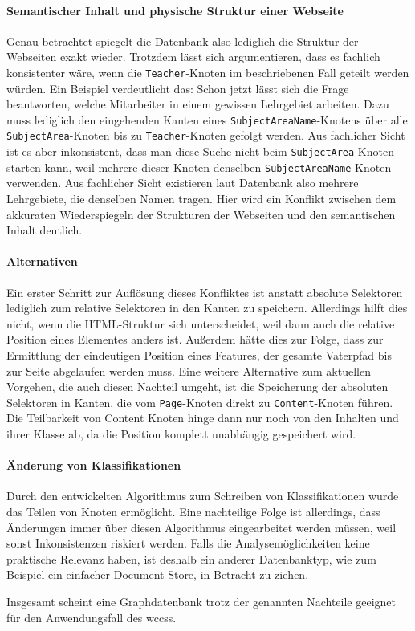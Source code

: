     \paragraph{Semantischer Inhalt und physische Struktur einer Webseite}
    Genau betrachtet spiegelt die Datenbank also lediglich die Struktur der Webseiten exakt wieder.
    Trotzdem lässt sich argumentieren, dass es fachlich konsistenter wäre,
    wenn die \texttt{Teacher}-Knoten im beschriebenen Fall geteilt werden würden.
    Ein Beispiel verdeutlicht das:
    Schon jetzt lässt sich die Frage beantworten,
    welche Mitarbeiter in einem gewissen Lehrgebiet arbeiten.
    Dazu muss lediglich den eingehenden Kanten eines
    \texttt{SubjectAreaName}-Knotens über alle \texttt{SubjectArea}-Knoten
    bis zu \texttt{Teacher}-Knoten gefolgt werden.
    Aus fachlicher Sicht ist es aber inkonsistent,
    dass man diese Suche nicht beim \texttt{SubjectArea}-Knoten
    starten kann, weil mehrere dieser Knoten denselben
    \texttt{SubjectAreaName}-Knoten verwenden.
    Aus fachlicher Sicht existieren laut Datenbank also mehrere Lehrgebiete,
    die denselben Namen tragen.
    Hier wird ein Konflikt zwischen dem akkuraten Wiederspiegeln der Strukturen der Webseiten
    und den semantischen Inhalt deutlich.

    \paragraph{Alternativen}
    Ein erster Schritt zur Auflösung dieses Konfliktes ist anstatt absolute Selektoren
    lediglich zum {\parentFeature} relative Selektoren in den Kanten zu speichern.
    Allerdings hilft dies nicht, wenn die HTML-Struktur sich unterscheidet,
    weil dann auch die relative Position eines Elementes anders ist.
    Außerdem hätte dies zur Folge, dass zur Ermittlung der eindeutigen Position
    eines Features, der gesamte Vaterpfad bis zur Seite abgelaufen werden muss.
    Eine weitere Alternative zum aktuellen Vorgehen,
    die auch diesen Nachteil umgeht,
    ist die Speicherung der absoluten Selektoren in Kanten,
    die vom \texttt{Page}-Knoten direkt zu \texttt{Content}-Knoten führen.
    Die Teilbarkeit von Content Knoten hinge dann nur noch von den Inhalten und ihrer Klasse ab,
    da die Position komplett unabhängig gespeichert wird.

    \paragraph{Änderung von Klassifikationen}
    Durch den entwickelten Algorithmus zum Schreiben von Klassifikationen
    wurde das Teilen von Knoten ermöglicht.
    Eine nachteilige Folge ist allerdings,
    dass Änderungen immer über diesen Algorithmus eingearbeitet werden müssen,
    weil sonst Inkonsistenzen riskiert werden.
    Falls die Analysemöglichkeiten keine praktische Relevanz haben,
    ist deshalb ein anderer Datenbanktyp, wie zum Beispiel ein einfacher Document Store,
    in Betracht zu ziehen.

    Insgesamt scheint eine Graphdatenbank trotz der genannten Nachteile geeignet
    für den Anwendungsfall des \glspl{wccs}.
